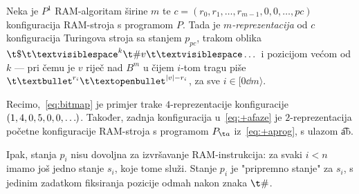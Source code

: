 \begin{definicija}[{name=[$m$-reprezentacija RAM-konfiguracije]}]
	Neka je $P^1$ RAM-algoritam širine $m$ te $c=(r_0,r_1,\dots,r_{m-1},0,0,\dots,pc)$ konfiguracija RAM-stroja s programom $P$. Tada je \emph{$m$-reprezentacija} od $c$ konfiguracija Turingova stroja sa stanjem $p_{pc}$, trakom oblika $\t\$\bl^k\t\#v\bl\dots$ i pozicijom većom od $k$ --- pri čemu je $v$ riječ nad $B^m$ u čijem $i$-tom tragu piše $\t\textbullet^{r_i}\t\textopenbullet^{\dulj v-r_i}$, za sve $i\in[0\dd m\rangle$.
\end{definicija}

Recimo,~\eqref{eq:bitmap} je primjer trake $4$-reprezentacije konfiguracije $(1,4,0,5,0,0,\dots\mspace{-1mu})$. Također, zadnja konfiguracija u~\eqref{eq:+afaze} je $2$-reprezentacija početne konfiguracije RAM-stroja s programom $P_{\t a}$ iz~\eqref{eq:+aprog}, s ulazom \t{ab}.

Ipak, stanja $p_i$ nisu dovoljna za izvršavanje RAM-instrukcija: za svaki $i<n$ imamo još jedno stanje $s_i$, koje tome služi. Stanje $p_i$ je "pripremno stanje" za $s_i$, s jedinim zadatkom fiksiranja pozicije odmah nakon znaka $\t\#$.


